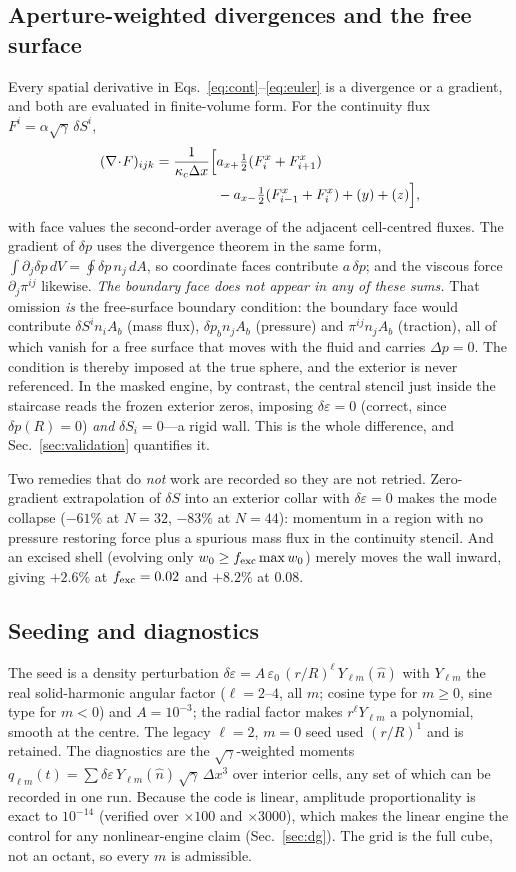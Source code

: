 \documentclass[aps,prd,reprint,amsmath,amssymb,nofootinbib,longbibliography,superscriptaddress]{revtex4-2}
\newcommand{\de}{\delta\varepsilon}
\newcommand{\dS}{\delta S}
\newcommand{\dpp}{\delta p}
\newcommand{\sg}{\sqrt{\gamma}}
\begin{document}
\subsection{Aperture-weighted divergences and the free surface}
Every spatial derivative in Eqs.~\eqref{eq:cont}--\eqref{eq:euler} is a divergence or a gradient,
and both are evaluated in finite-volume form. For the continuity flux $F^i = \alpha\sg\,\dS^i$,
\begin{align}
(\nabla\!\cdot\!F)_{ijk} = \frac{1}{\kappa_c\Delta x}\Big[&a_{x+}\tfrac12(F^x_{i}+F^x_{i+1})\notag\\
 &- a_{x-}\tfrac12(F^x_{i-1}+F^x_i) + (y) + (z)\Big],
\label{eq:divF}
\end{align}
with face values the second-order average of the adjacent cell-centred fluxes. The gradient of
$\dpp$ uses the divergence theorem in the same form, $\int\partial_j\dpp\,dV = \oint\dpp\,n_j\,dA$,
so coordinate faces contribute $a\,\dpp$; and the viscous force $\partial_j\pi^{ij}$ likewise.
\emph{The boundary face does not appear in any of these sums.} That omission \emph{is} the
free-surface boundary condition: the boundary face would contribute $\dS^i n_i A_b$ (mass flux),
$\dpp_bn_jA_b$ (pressure) and $\pi^{ij}n_jA_b$ (traction), all of which vanish for a free
surface that moves with the fluid and carries $\Delta p = 0$. The condition is thereby imposed at
the true sphere, and the exterior is never referenced. In the masked engine, by contrast, the
central stencil just inside the staircase reads the frozen exterior zeros, imposing $\de = 0$
(correct, since $\dpp(R)=0$) \emph{and} $\dS_i = 0$---a rigid wall. This is the whole difference,
and Sec.~\ref{sec:validation} quantifies it.

Two remedies that do \emph{not} work are recorded so they are not retried. Zero-gradient
extrapolation of $\dS$ into an exterior collar with $\de = 0$ makes the mode collapse
($-61\%$ at $N=32$, $-83\%$ at $N=44$): momentum in a region with no pressure restoring force
plus a spurious mass flux in the continuity stencil. And an excised shell (evolving only
$w_0 \ge f_{\rm exc}\max w_0$) merely moves the wall inward, giving $+2.6\%$ at $f_{\rm exc}=0.02$
and $+8.2\%$ at $0.08$.

\subsection{Seeding and diagnostics}
The seed is a density perturbation $\de = A\,\varepsilon_0\,(r/R)^\ell\,Y_{\ell m}(\hat n)$ with
$Y_{\ell m}$ the real solid-harmonic angular factor ($\ell = 2$--$4$, all $m$; cosine type for
$m\ge0$, sine type for $m<0$) and $A = 10^{-3}$; the radial factor makes $r^\ell Y_{\ell m}$ a
polynomial, smooth at the centre. The legacy $\ell=2$, $m=0$ seed used $(r/R)^1$ and is retained.
The diagnostics are the $\sg$-weighted moments $q_{\ell m}(t) = \sum\de\,Y_{\ell m}(\hat n)\,\sg\,
\Delta x^3$ over interior cells, any set of which can be recorded in one run. Because the code is
linear, amplitude proportionality is exact to $10^{-14}$ (verified over $\times100$ and
$\times3000$), which makes the linear engine the control for any nonlinear-engine claim
(Sec.~\ref{sec:dg}). The grid is the full cube, not an octant, so every $m$ is admissible.
\end{document}
